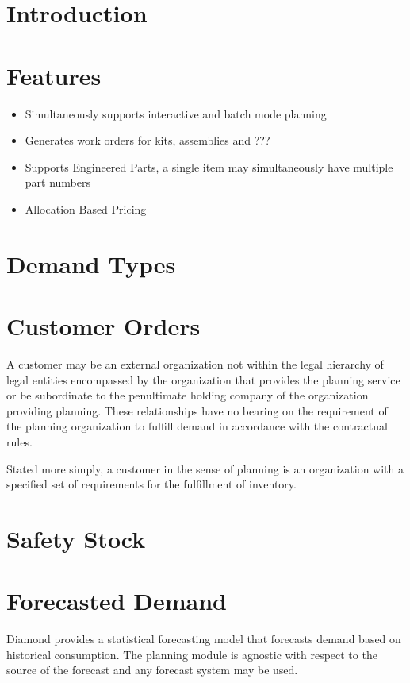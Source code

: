 \documentclass[letterpaper,10pt,english]{sphinxmanual}
\begin{document}
\section{Introduction}
\label{APS/ApsFeatures:introduction}

\section{Features}
\label{APS/ApsFeatures:features}\begin{itemize}
\item {} 
Simultaneously supports interactive and batch mode planning

\item {} 
Generates work orders for kits, assemblies and ???

\item {} 
Supports Engineered Parts, a single item may simultaneously have
multiple part numbers

\item {} 
Allocation Based Pricing

\end{itemize}


\section{Demand Types}
\label{APS/ApsFeatures:demand-types}

\section{Customer Orders}
\label{APS/ApsFeatures:customer-orders}
A customer may be an external organization not within the legal
hierarchy of legal entities encompassed by the organization that
provides the planning service or be subordinate to the penultimate
holding company of the organization providing planning. These
relationships have no bearing on the requirement of the planning
organization to fulfill demand in accordance with the contractual rules.

Stated more simply, a customer in the sense of planning is an
organization with a specified set of requirements for the fulfillment of
inventory.


\section{Safety Stock}
\label{APS/ApsFeatures:safety-stock}

\section{Forecasted Demand}
\label{APS/ApsFeatures:forecasted-demand}
Diamond provides a statistical forecasting model that forecasts demand
based on historical consumption. The planning module is agnostic with
respect to the source of the forecast and any forecast system may be
used.
\end{document}
